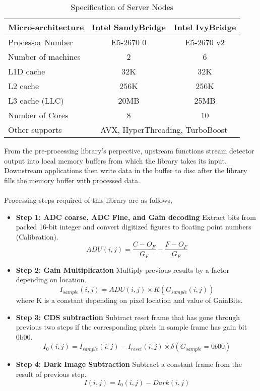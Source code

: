 \documentclass[journal]{IEEEtran}
\begin{document}
\begin{table}[h]
\centering
\label{servers}
\begin{tabular}{l | c c}
\hline
Micro-architecture & Intel SandyBridge & Intel IvyBridge \\
\hline
Processor Number& 	E5-2670 0	& E5-2670 v2 \\
Number of machines&	2		& 6	\\
L1D cache	&	32K		& 32K \\
L2 cache	&	256K		& 256K \\
L3 cache (LLC)	&	20MB		& 25MB \\
Number of Cores  &	8		& 10	\\
\hline
Other supports  & 
\multicolumn{2}{|c}{AVX, HyperThreading, TurboBoost}  	\\
\hline
\end{tabular}
\caption{Specification of Server Nodes}
\end{table}


From the pre-processing library's perpective, upstream functions stream detector output into local memory buffers from which the library takes its input. Downstream applications then write data in the buffer to disc after the library fills the memory buffer with processed data. \\ \\
Processing steps required of this library are as follows,
\begin{itemize}
 \item \textbf{Step 1: ADC coarse, ADC Fine, and Gain decoding} Extract bits from packed 16-bit integer and convert digitized figures to floating point numbers (Calibration).
	\begin{equation}
		ADU(i,j) = \frac{C - O_F}{G_F} - \frac{F - O_F}{G_F}
	\end{equation}
 \item \textbf{Step 2: Gain Multiplication} Multiply previous results by a factor depending on location.
	\begin{equation}
		I_{sample}(i,j) = ADU(i,j) \times K(G_{sample}(i,j))
	\end{equation}
where K is a constant depending on pixel location and value of GainBits.	
 \item \textbf{Step 3: CDS subtraction} Subtract reset frame that has gone through previous two steps if the corresponding pixels in sample frame has gain bit 0b00.
	\begin{equation}	
		I_0(i,j) = I_{sample}(i,j) - I_{reset}(i,j) \times \delta(G_{sample}=0b00)
	\end{equation}
 \item \textbf{Step 4: Dark Image Subtraction} Subtract a constant frame from the result of previous step.
	\begin{equation}
		I(i,j) = I_0(i,j) - Dark(i,j)
	\end{equation}
\end{itemize}
\end{document}
